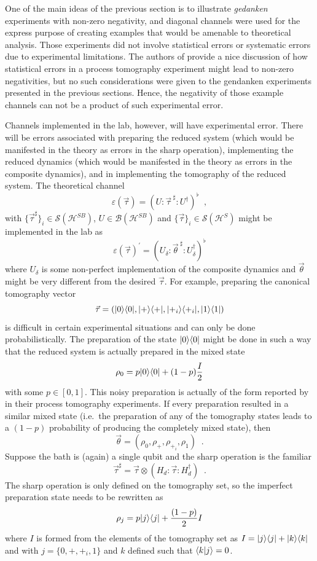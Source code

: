 One of the main ideas of the previous section is to illustrate {\em gedanken} experiments with non-zero negativity, and diagonal channels were used for the express purpose of creating examples that would be amenable to theoretical analysis.  Those experiments did not involve statistical errors or systematic errors due to experimental limitations.  The authors of \cite{Wood2009} provide a nice discussion of how statistical errors in a process tomography experiment might lead to non-zero negativities, but no such considerations were given to the gendanken experiments presented in the previous sections.  Hence, the negativity of those example channels can not be a product of such experimental error.  

Channels implemented in the lab, however, will have experimental error.  There will be errors associated with preparing the reduced system (which would be manifested in the theory as errors in the sharp operation), implementing the reduced dynamics (which would be manifested in the theory as errors in the composite dynamics), and in implementing the tomography of the reduced system.  The theoretical channel
$$
\varepsilon(\vec{\tau})=\left(U:\vec{\tau}^{\;\sharp}:U^\dagger\right)^\flat\;\;,
$$
with $\{\vec{\tau}^\sharp\}_i\in\mathcal{S}(\mathcal{H}^{SB})$, $U\in\mathcal{B}(\mathcal{H}^{SB})$ and $\{\vec{\tau}\}_i\in\mathcal{S}(\mathcal{H}^{S})$ might be implemented in the lab as
$$
\varepsilon(\vec{\tau})^\prime = \left( U_\delta:\vec{\theta}^{\;\sharp}:U_\delta^\dagger\right)^\flat
$$
where $U_\delta$ is some non-perfect implementation of the composite dynamics and $\vec{\theta}$ might be very different from the desired $\vec{\tau}$.  For example, preparing the canonical tomography vector
$$
\vec{\tau}=\left(|0\rangle\langle0|,|+\rangle\langle+|,|+_i\rangle\langle+_i|,|1\rangle\langle1|\right)
$$
is difficult in certain experimental situations and can only be done probabilistically.  The preparation of the state $|0\rangle\langle0|$ might be done in such a way that the reduced system is actually prepared in the mixed state
$$
\rho_0 = p |0\rangle\langle0| + (1-p) \frac{I}{2}
$$
with some $p\in[0,1]$.  This noisy preparation is actually of the form reported by \cite{Howard2006} in their process tomography experiments.  If every preparation resulted in a similar mixed state (i.e.\ the preparation of any of the tomography states leads to a $(1-p)$ probability of producing the completely mixed state), then
$$
\vec{\theta} = \left(\rho_0,\rho_+,\rho_{+_i},\rho_1\right)\;\;.
$$
Suppose the bath is (again) a single qubit and the sharp operation is the familiar
$$
\vec{\tau}^\sharp = \vec{\tau}\otimes \left(H_d:\vec{\tau}:H_d^\dagger\right)\;\;.
$$
The sharp operation is only defined on the tomography set, so the imperfect preparation state needs to be rewritten as
$$
\rho_j = p|j\rangle\langle j| + \frac{(1-p)}{2}I
$$
where $I$ is formed from the elements of the tomography set as $I=|j\rangle\langle j|+|k\rangle\langle k|$ and with $j=\{0,+,+_i,1\}$ and $k$ defined such that $\langle k|j\rangle=0$.  

